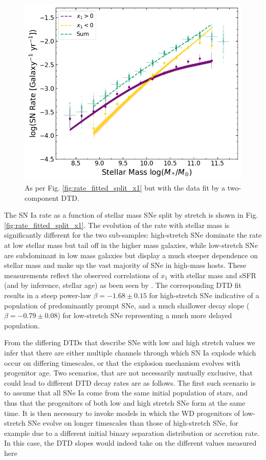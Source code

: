 \documentclass[fleqn,usenatbib]{mnras}
\begin{document}
\begin{figure}
    \centering
    \includegraphics[width=.5\textwidth]{figs/rate_vs_mass_DTD_fit_beta_norm_Qerf1.1_split_x1_fitjoint.png}
    \caption{As per Fig. \ref{fig:rate_fitted_split_x1} but with the data fit by a two-component DTD.%
    \label{fig:rate_fitted_split_x1_2c_DTD}}
\end{figure}
The SN Ia rate as a function of stellar mass SNe split by stretch is shown in Fig. \ref{fig:rate_fitted_split_x1}. The evolution of the rate with stellar mass is significantly different for the two sub-samples: high-stretch SNe dominate the rate at low stellar mass but tail off in the higher mass galaxies, while low-stretch SNe are subdominant in low mass galaxies but display a much steeper dependence on stellar mass and make up the vast majority of SNe in high-mass hosts. These measurements reflect the observed correlations of $x_1$ with stellar mass and sSFR (and by inference, stellar age) as been seen by \citet{Rigault2013,Rigault2018,Nicolas2020}. The corresponding DTD fit results in a steep power-law $\beta = -1.68 \pm 0.15$ for high-stretch SNe indicative of a population of predominantly prompt SNe, and a much shallower decay slope ($\beta = -0.79 \pm 0.08$) for low-stretch SNe representing a much more delayed population. 

From the differing DTDs that describe SNe with low and high stretch values we infer that there are either multiple channels through which SN Ia explode which occur on differing timescales, or that the explosion mechanism evolves with progenitor age. Two scenarios, that are not necessarily mutually exclusive, that could lead to different DTD decay rates are as follows. 
The first such scenario is to assume that all SNe Ia come from the same initial population of stars, and thus that the progenitors of both low and high stretch SNe form at the same time. It is then necessary to invoke models in which the WD progenitors of low-stretch SNe evolve on longer timescales than those of high-stretch SNe, for example due to a different initial binary separation distribution or accretion rate. In this case, the DTD slopes would indeed take on the different values measured here
\end{document}
